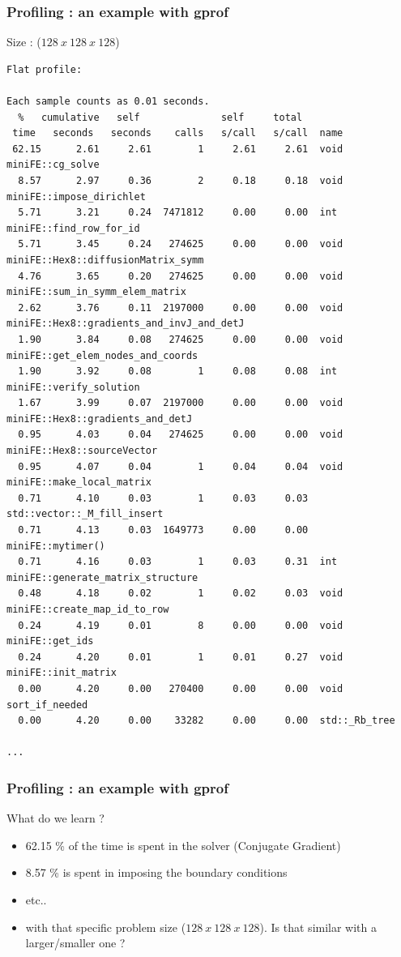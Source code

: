 \begin{frame}[containsverbatim]
	\frametitle{Profiling : an example with gprof}

Size : ($128~x~128~x~128$)

	\begin{Verbatim}[fontsize=\tiny]
Flat profile:

Each sample counts as 0.01 seconds.
  %   cumulative   self              self     total           
 time   seconds   seconds    calls   s/call   s/call  name    
 62.15      2.61     2.61        1     2.61     2.61  void miniFE::cg_solve
  8.57      2.97     0.36        2     0.18     0.18  void miniFE::impose_dirichlet
  5.71      3.21     0.24  7471812     0.00     0.00  int miniFE::find_row_for_id
  5.71      3.45     0.24   274625     0.00     0.00  void miniFE::Hex8::diffusionMatrix_symm
  4.76      3.65     0.20   274625     0.00     0.00  void miniFE::sum_in_symm_elem_matrix
  2.62      3.76     0.11  2197000     0.00     0.00  void miniFE::Hex8::gradients_and_invJ_and_detJ
  1.90      3.84     0.08   274625     0.00     0.00  void miniFE::get_elem_nodes_and_coords
  1.90      3.92     0.08        1     0.08     0.08  int miniFE::verify_solution
  1.67      3.99     0.07  2197000     0.00     0.00  void miniFE::Hex8::gradients_and_detJ
  0.95      4.03     0.04   274625     0.00     0.00  void miniFE::Hex8::sourceVector
  0.95      4.07     0.04        1     0.04     0.04  void miniFE::make_local_matrix
  0.71      4.10     0.03        1     0.03     0.03  std::vector::_M_fill_insert
  0.71      4.13     0.03  1649773     0.00     0.00  miniFE::mytimer()
  0.71      4.16     0.03        1     0.03     0.31  int miniFE::generate_matrix_structure
  0.48      4.18     0.02        1     0.02     0.03  void miniFE::create_map_id_to_row
  0.24      4.19     0.01        8     0.00     0.00  void miniFE::get_ids
  0.24      4.20     0.01        1     0.01     0.27  void miniFE::init_matrix
  0.00      4.20     0.00   270400     0.00     0.00  void sort_if_needed
  0.00      4.20     0.00    33282     0.00     0.00  std::_Rb_tree

...
	\end{Verbatim}
\end{frame}


\begin{frame}
	\frametitle{Profiling : an example with gprof}

What do we learn ?

	\begin{itemize}
	\item 62.15 \% of the time is spent in the solver (Conjugate Gradient)
	\item 8.57 \% is spent in imposing the boundary conditions
	\item etc..
	\item with that specific problem size ($128~x~128~x~128$). Is that similar with a larger/smaller one ?
	\end{itemize}
\end{frame}


